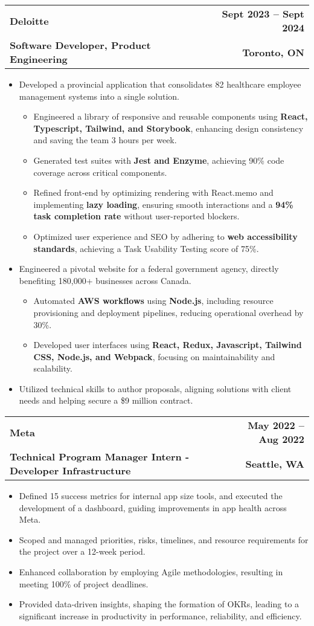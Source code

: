\documentclass[letterpaper,11pt]{article}
\makeatletter
\newcommand{\resumeItem}[1]{
  \item\small{
    {#1 \vspace{-2pt}}
  }
}
\newcommand{\resumeSubheading}[4]{
  \vspace{-2pt}\item
    \begin{tabular*}{1.0\textwidth}[t]{l@{\extracolsep{\fill}}r}
      \textbf{#1} & \textbf{\small #2} \\
      \textbf{\small #3} & \textbf{\small #4} \\
    \end{tabular*}\vspace{-7pt}
}
\newcommand{\resumeItemListStart}{\begin{itemize}}
\newcommand{\resumeItemListEnd}{\end{itemize}\vspace{-5pt}}
\makeatother
\begin{document}
\resumeSubheading
{Deloitte}{Sept 2023 -- Sept 2024}
{Software Developer, Product Engineering}{Toronto, ON}
\resumeItemListStart
\resumeItem{Developed a provincial application that consolidates 82 healthcare employee management systems into a single solution.
  \begin{itemize}
     \item{Engineered a library of responsive and reusable components using \textbf{React, Typescript, Tailwind, and Storybook}, enhancing design consistency and saving the team 3 hours per week.}
    \item{Generated test suites with \textbf{Jest and Enzyme}, achieving 90\% code coverage across critical components.}
    \item{Refined front-end by optimizing rendering with React.memo and implementing \textbf{lazy loading}, ensuring smooth interactions and a \textbf{94\% task completion rate} without user-reported blockers.}
    \item{Optimized user experience and SEO by adhering to \textbf{web accessibility standards}, achieving a Task Usability Testing score of 75\%.}
    
  \end{itemize}
}
\resumeItem{Engineered a pivotal website for a federal government agency, directly benefiting 180,000+ businesses across Canada.}
\begin{itemize}
    \item{Automated \textbf{AWS workflows} using \textbf{Node.js}, including resource provisioning and deployment pipelines, reducing operational overhead by 30\%.}
    \item{Developed user interfaces using \textbf{React, Redux, Javascript, Tailwind CSS, Node.js, and Webpack}, focusing on maintainability and scalability.}

\end{itemize}
\resumeItem{Utilized technical skills to author proposals, aligning solutions with client needs and helping secure a \$9 million contract.}

\resumeItemListEnd

\resumeSubheading
{Meta}{May 2022 -- Aug 2022}
{Technical Program Manager Intern - Developer Infrastructure}{Seattle, WA}
\resumeItemListStart
\resumeItem{Defined 15 success metrics for internal app size tools, and executed the development of a dashboard, guiding improvements in app health across Meta.}
\resumeItem{Scoped and managed priorities, risks, timelines, and resource requirements for the project over a 12-week period.}
\resumeItem{Enhanced collaboration by employing Agile methodologies, resulting in meeting 100\% of project deadlines.}
\resumeItem{Provided data-driven insights, shaping the formation of OKRs, leading to a significant increase in productivity in performance, reliability, and efficiency.}
\resumeItemListEnd
\end{document}
